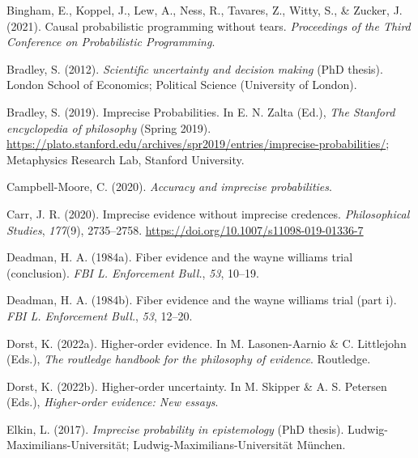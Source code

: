 \documentclass[
  letterpaper,
  DIV=11,
  numbers=noendperiod]{scrartcl}
\newlength{\cslhangindent}
\newlength{\cslentryspacingunit} %
\newenvironment{CSLReferences}[2] %
 {%
  \setlength{\parindent}{0pt}
  \ifodd #1
  \let\oldpar\par
  \def\par{\hangindent=\cslhangindent\oldpar}
  \fi
  \setlength{\parskip}{#2\cslentryspacingunit}
 }%
 {}
\begin{document}
\hypertarget{refs}{}
\begin{CSLReferences}{1}{0}
\leavevmode{}%
Bingham, E., Koppel, J., Lew, A., Ness, R., Tavares, Z., Witty, S., \&
Zucker, J. (2021). Causal probabilistic programming without tears.
\emph{Proceedings of the Third Conference on Probabilistic Programming}.

\leavevmode{}%
Bradley, S. (2012). \emph{Scientific uncertainty and decision making}
(PhD thesis). London School of Economics; Political Science (University
of London).

\leavevmode{}%
Bradley, S. (2019). {Imprecise Probabilities}. In E. N. Zalta (Ed.),
\emph{The {Stanford} encyclopedia of philosophy} ({S}pring 2019).
\url{https://plato.stanford.edu/archives/spr2019/entries/imprecise-probabilities/};
Metaphysics Research Lab, Stanford University.

\leavevmode{}%
Campbell-Moore, C. (2020). \emph{Accuracy and imprecise probabilities}.

\leavevmode{}%
Carr, J. R. (2020). Imprecise evidence without imprecise credences.
\emph{Philosophical Studies}, \emph{177}(9), 2735--2758.
\url{https://doi.org/10.1007/s11098-019-01336-7}

\leavevmode{}%
Deadman, H. A. (1984a). Fiber evidence and the wayne williams trial
(conclusion). \emph{FBI L. Enforcement Bull.}, \emph{53}, 10--19.

\leavevmode{}%
Deadman, H. A. (1984b). Fiber evidence and the wayne williams trial
(part i). \emph{FBI L. Enforcement Bull.}, \emph{53}, 12--20.

\leavevmode{}%
Dorst, K. (2022a). Higher-order evidence. In M. Lasonen-Aarnio \& C.
Littlejohn (Eds.), \emph{The routledge handbook for the philosophy of
evidence}. Routledge.

\leavevmode{}%
Dorst, K. (2022b). Higher-order uncertainty. In M. Skipper \& A. S.
Petersen (Eds.), \emph{Higher-order evidence: New essays}.

\leavevmode{}%
Elkin, L. (2017). \emph{Imprecise probability in epistemology} (PhD
thesis). Ludwig-Maximilians-Universit{ä}t;
Ludwig-Maximilians-Universität München.


\end{CSLReferences}
\end{document}

